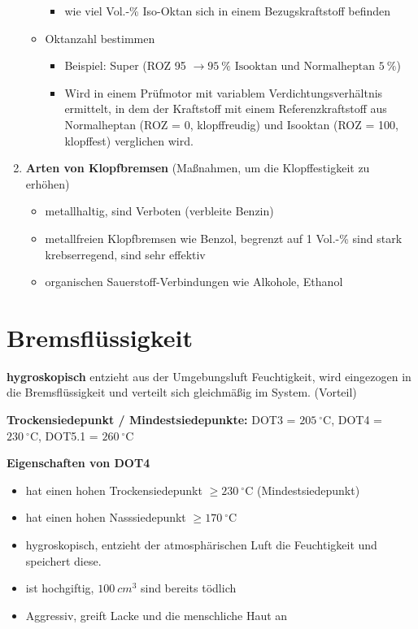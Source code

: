 \begin{enumerate}
\begin{itemize}
    \begin{itemize}
    \item
      wie viel Vol.-\% Iso-Oktan sich in einem Bezugskraftstoff befinden
    \end{itemize}
  \item
    Oktanzahl bestimmen

    \begin{itemize}
    \item
      Beispiel: Super (ROZ 95
      $\to 95~\% \text{ Isooktan und Normalheptan } 5~\%$)
    \item
      Wird in einem Prüfmotor mit variablem Verdichtungsverhältnis
      ermittelt, in dem der Kraftstoff mit einem Referenzkraftstoff aus
      Normalheptan (ROZ = 0, klopffreudig) und Isooktan (ROZ = 100,
      klopffest) verglichen wird.
    \end{itemize}
  \end{itemize}
\item
  \textbf{Arten von Klopfbremsen} (Maßnahmen, um die Klopffestigkeit zu
  erhöhen)

  \begin{itemize}
  \item
    metallhaltig, sind Verboten (verbleite Benzin)
  \item
    metallfreien Klopfbremsen wie Benzol, begrenzt auf 1 Vol.-\% sind
    stark krebserregend, sind sehr effektiv
  \item
    organischen Sauerstoff-Verbindungen wie Alkohole, Ethanol
  \end{itemize}
\end{enumerate}

\section{Bremsflüssigkeit}\label{bremsfluessigkeit}

\textbf{hygroskopisch} entzieht aus der Umgebungsluft Feuchtigkeit, wird
eingezogen in die Bremsflüssigkeit und verteilt sich gleichmäßig im
System. (Vorteil)

\textbf{Trockensiedepunkt / Mindestsiedepunkte:} DOT3 =
$205~^\circ\text{C}$, DOT4 = $230~^\circ\text{C}$, DOT5.1 =
$260~^\circ\text{C}$

\textbf{Eigenschaften von DOT4}

\begin{itemize}
\item
  hat einen hohen Trockensiedepunkt $\geq 230~^\circ\text{C}$
  (Mindestsiedepunkt)
\item
  hat einen hohen Nasssiedepunkt $\geq 170~^\circ\text{C}$
\item
  hygroskopisch, entzieht der atmosphärischen Luft die Feuchtigkeit und
  speichert diese.
\item
  ist hochgiftig, $100~cm^3$ sind bereits tödlich
\item
  Aggressiv, greift Lacke und die menschliche Haut an
\end{itemize}


